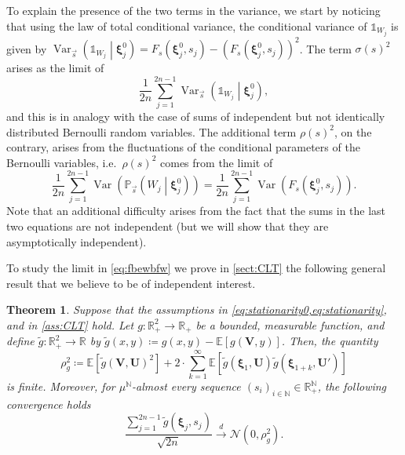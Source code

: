 \documentclass[11pt,a4paper,oneside]{article}
\newtheorem{thm}{Theorem}[section]
\theoremstyle{definition}
\theoremstyle{remark}
\def\N{\mathbb{N}}
\def\E{\mathbb{E}}
\def\P{\mathbb{P}}
\def\R{\mathbb{R}}
\DeclareMathOperator{\Var}{Var}
\begin{document}
To explain the presence of the two terms in the variance, we start by noticing that using the law of total conditional variance, the conditional variance of $\mathds{1}_{W_j}$ is given by $\Var_{\vec{s}} \left(\mathds{1}_{W_j}\middle | \bm \xi^{0}_j\right)= F_s (\bm \xi^{0}_j, s_j ) - (F_s (\bm \xi^{0}_j, s_j ))^2$. The term $\sigma(s)^2$ arises as the limit of 
$$ \frac{1}{2n} \sum_{j=1}^{2n-1} \Var_{\vec{s}} \left(\mathds{1}_{W_j}\middle | \bm \xi^{0}_j\right),$$
and this is in analogy with the case of sums of independent but not identically distributed Bernoulli random variables. The additional term $\rho(s)^2$, on the contrary, arises from the fluctuations of the conditional parameters of the Bernoulli variables, i.e.\  $\rho(s)^2$ comes from the limit of 
\begin{equation}\label{eq:fbewbfw}
	\frac{1}{2n} \sum_{j=1}^{2n-1} \Var \left(\P_{\vec{s}} \left(W_j\middle | \bm \xi^{0}_j\right) \right)=\frac{1}{2n} \sum_{j=1}^{2n-1} \Var \left( F_s (\bm \xi^{0}_j, s_j ) \right).
\end{equation}
Note that an additional difficulty arises from the fact that the sums in the last two equations are not independent (but we will show that they are asymptotically independent).

To study the limit in \cref{eq:fbewbfw} we prove in \cref{sect:CLT} the following general result that we believe to be of independent interest.

\begin{thm}\label{prop:clt_sum_of_the_g}
	Suppose that the assumptions in \cref{eq:stationarity0,eq:stationarity}, and in \cref{ass:CLT} hold. Let $g:\R^2_+\to\R_+$ be a bounded, measurable function, and define $\tilde g :\R^2_+\to\R$ by $\tilde g (x,y) \coloneqq g(x,y) - \E \left[ g\left( \bm V, y\right) \right]$. Then, the quantity
	\begin{equation}\label{eq:def_of_rho}
		\rho_g^2 \coloneqq  \E \left[ \tilde g (\bm V, \bm U)^2 \right] + 2 \cdot \sum_{k=1}^{\infty} \E\left[ \tilde g(\bm{\xi}_1, \bm U) \tilde g (\bm{\xi}_{1+k}, \bm U') \right]
	\end{equation}
	is finite. Moreover, for $\mu^{\N}$-almost every sequence $(s_i)_{{i\in\N}}\in\R^{\N}_{+}$, the following convergence holds
	\begin{equation}\label{eq:CLT2}
		\frac{\sum_{j=1}^{2n-1}\tilde g\left(\bm \xi_j,s_j\right)}{\sqrt{2n}}\xrightarrow{d} \bm{\mathcal{N}}(0,\rho_g^2).
	\end{equation}
\end{thm}
\end{document}
